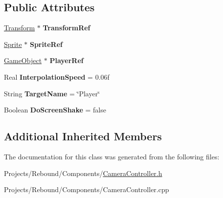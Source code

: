 \subsection*{Public Attributes}
\begin{DoxyCompactItemize}
\item 
\hypertarget{classDCEngine_1_1Components_1_1CameraController_a5190142b41d9a25608c5dc4d5efe1171}{\hyperlink{classDCEngine_1_1Components_1_1Transform}{Transform} $\ast$ {\bfseries Transform\-Ref}}\label{classDCEngine_1_1Components_1_1CameraController_a5190142b41d9a25608c5dc4d5efe1171}

\item 
\hypertarget{classDCEngine_1_1Components_1_1CameraController_a0162002af3f11d7b6245de3f9aa58193}{\hyperlink{classDCEngine_1_1Components_1_1Sprite}{Sprite} $\ast$ {\bfseries Sprite\-Ref}}\label{classDCEngine_1_1Components_1_1CameraController_a0162002af3f11d7b6245de3f9aa58193}

\item 
\hypertarget{classDCEngine_1_1Components_1_1CameraController_ae80025e660b279db751ebcd69d30de18}{\hyperlink{classDCEngine_1_1GameObject}{Game\-Object} $\ast$ {\bfseries Player\-Ref}}\label{classDCEngine_1_1Components_1_1CameraController_ae80025e660b279db751ebcd69d30de18}

\item 
\hypertarget{classDCEngine_1_1Components_1_1CameraController_a7204ad61f0f57addd17b3a1fbeea93c4}{Real {\bfseries Interpolation\-Speed} = 0.\-06f}\label{classDCEngine_1_1Components_1_1CameraController_a7204ad61f0f57addd17b3a1fbeea93c4}

\item 
\hypertarget{classDCEngine_1_1Components_1_1CameraController_a9cee8d024f211e9d863cd6555585504e}{String {\bfseries Target\-Name} = \char`\"{}Player\char`\"{}}\label{classDCEngine_1_1Components_1_1CameraController_a9cee8d024f211e9d863cd6555585504e}

\item 
\hypertarget{classDCEngine_1_1Components_1_1CameraController_ae3a5ee0e7bc89903babb3a5426dd266c}{Boolean {\bfseries Do\-Screen\-Shake} = false}\label{classDCEngine_1_1Components_1_1CameraController_ae3a5ee0e7bc89903babb3a5426dd266c}

\end{DoxyCompactItemize}
\subsection*{Additional Inherited Members}


The documentation for this class was generated from the following files\-:\begin{DoxyCompactItemize}
\item 
Projects/\-Rebound/\-Components/\hyperlink{CameraController_8h}{Camera\-Controller.\-h}\item 
Projects/\-Rebound/\-Components/Camera\-Controller.\-cpp\end{DoxyCompactItemize}
